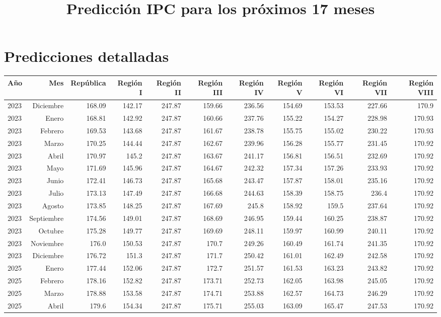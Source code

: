 \documentclass{article}%
\title{Predicción IPC para los próximos 17 meses}%
\date{}%
\begin{document}
%
\normalsize%
\maketitle%
\section*{Predicciones detalladas}%
\label{sec:Prediccionesdetalladas}%
\begin{longtable}{|l r|r|r|r|r|r|r|r|r|r|}%
\hline%
Año&Mes&República&Región I&Región II&Región III&Región IV&Región V&Región VI&Región VII&Región VIII\\%
\hline%
2023&Diciembre&168.09&142.17&247.87&159.66&236.56&154.69&153.53&227.66&170.9\\%
2023&Enero&168.81&142.92&247.87&160.66&237.76&155.22&154.27&228.98&170.93\\%
2023&Febrero&169.53&143.68&247.87&161.67&238.78&155.75&155.02&230.22&170.93\\%
2023&Marzo&170.25&144.44&247.87&162.67&239.96&156.28&155.77&231.45&170.92\\%
2023&Abril&170.97&145.2&247.87&163.67&241.17&156.81&156.51&232.69&170.92\\%
2023&Mayo&171.69&145.96&247.87&164.67&242.32&157.34&157.26&233.93&170.92\\%
2023&Junio&172.41&146.73&247.87&165.68&243.47&157.87&158.01&235.16&170.92\\%
2023&Julio&173.13&147.49&247.87&166.68&244.63&158.39&158.75&236.4&170.92\\%
2023&Agosto&173.85&148.25&247.87&167.69&245.8&158.92&159.5&237.64&170.92\\%
2023&Septiembre&174.56&149.01&247.87&168.69&246.95&159.44&160.25&238.87&170.92\\%
2023&Octubre&175.28&149.77&247.87&169.69&248.11&159.97&160.99&240.11&170.92\\%
2023&Noviembre&176.0&150.53&247.87&170.7&249.26&160.49&161.74&241.35&170.92\\%
2023&Diciembre&176.72&151.3&247.87&171.7&250.42&161.01&162.49&242.58&170.92\\%
2025&Enero&177.44&152.06&247.87&172.7&251.57&161.53&163.23&243.82&170.92\\%
2025&Febrero&178.16&152.82&247.87&173.71&252.73&162.05&163.98&245.05&170.92\\%
2025&Marzo&178.88&153.58&247.87&174.71&253.88&162.57&164.73&246.29&170.92\\%
2025&Abril&179.6&154.34&247.87&175.71&255.03&163.09&165.47&247.53&170.92\\%
\hline%
\end{longtable}

%
\end{document}
